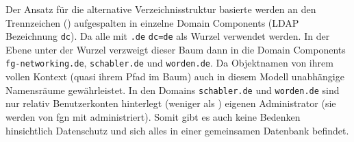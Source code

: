 \documentclass[11pt,a4paper,titlepage=firstiscover]{scrartcl} %
\begin{document}

Der Ansatz für die alternative Verzeichnisstruktur basierte 
   
werden  an den Trennzeichen () aufgespalten in einzelne Domain Components (LDAP Bezeichnung 
\texttt{dc}). Da alle  
 mit \texttt{.de}  \texttt{dc=de} als 
Wurzel  verwendet werden. In der 
 Ebene unter der Wurzel verzweigt dieser Baum dann in die 
 Domain Components \texttt{fg-networking.de}, 
\texttt{schabler.de} und \texttt{worden.de}. Da Objektnamen von ihrem vollen 
Kontext (quasi ihrem Pfad im Baum)  auch in diesem Modell 
 unabhängige Namensräume gewährleistet. In den Domains 
\texttt{schabler.de} und \texttt{worden.de} sind nur relativ 
 Benutzerkonten hinterlegt (weniger als 
)  eigenen Administrator (sie werden von 
fgn mit administriert). Somit gibt es auch keine Bedenken hinsichtlich 
Datenschutz und  sich alles in einer gemeinsamen 
Datenbank befindet.  
 
\end{document}
